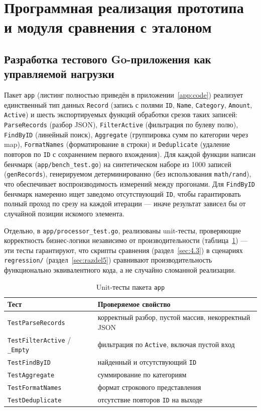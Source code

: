 \section{Программная реализация прототипа и модуля сравнения с эталоном}
\label{sec:razdel4}

\subsection{Разработка тестового Go-приложения как управляемой нагрузки}
\label{sec:4.1}

Пакет \texttt{app} (листинг полностью приведён в приложении~\ref{app:code})
реализует единственный тип данных \texttt{Record} (запись с полями
\texttt{ID}, \texttt{Name}, \texttt{Category}, \texttt{Amount}, \texttt{Active})
и шесть экспортируемых функций обработки срезов таких записей:
\texttt{ParseRecords} (разбор JSON), \texttt{FilterActive} (фильтрация по
булеву полю), \texttt{FindByID} (линейный поиск), \texttt{Aggregate}
(группировка сумм по категории через map), \texttt{FormatNames}
(форматирование в строки) и \texttt{Deduplicate} (удаление повторов по
\texttt{ID} с сохранением первого вхождения). Для каждой функции написан
бенчмарк (\texttt{app/\allowbreak bench\_test.go}) на синтетическом наборе из 1000
записей (\texttt{genRecords}), генерируемом детерминированно (без
использования \texttt{math/\allowbreak rand}), что обеспечивает воспроизводимость
измерений между прогонами. Для \texttt{FindByID} бенчмарк намеренно ищет
заведомо отсутствующий \texttt{ID}, чтобы гарантировать полный проход по
срезу на каждой итерации — иначе результат зависел бы от случайной позиции
искомого элемента.

Отдельно, в \texttt{app/\allowbreak processor\_test.go}, реализованы unit-тесты,
проверяющие корректность бизнес-логики независимо от производительности
(таблица~\ref{tab:4.1}) — эти тесты гарантируют, что скрипты сравнения
(раздел~\ref{sec:4.3}) в сценариях \texttt{regression/\allowbreak *}
(раздел~\ref{sec:razdel5}) сравнивают производительность функционально
эквивалентного кода, а не случайно сломанной реализации.

\begin{table}[htbp]
\caption{Unit-тесты пакета \texttt{app}}
\label{tab:4.1}
\centering
\begin{tabular}{ll}
\toprule
Тест & Проверяемое свойство \\
\midrule
\texttt{TestParseRecords} & корректный разбор, пустой массив, некорректный JSON \\
\texttt{TestFilterActive} / \texttt{\_Empty} & фильтрация по \texttt{Active}, включая пустой вход \\
\texttt{TestFindByID} & найденный и отсутствующий \texttt{ID} \\
\texttt{TestAggregate} & суммирование по категориям \\
\texttt{TestFormatNames} & формат строкового представления \\
\texttt{TestDeduplicate} & отсутствие повторов \texttt{ID} на выходе \\
\bottomrule
\end{tabular}
\end{table}

